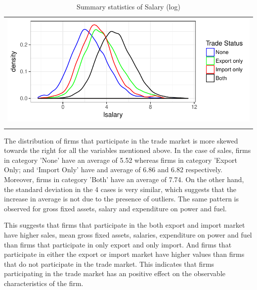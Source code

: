 \documentclass[12pt]{article}
\begin{document}
\begin{center}
\begin{table}[H]
\caption{Summary statistics of Salary (log)}
\label{tab:lsalary}
\begin{tabular}{c}
 \includegraphics{./PICS/denslsalary.pdf}   \\ 
   \\  
\end{tabular}
\end{table}
\end{center}

The distribution of firms that participate in the trade market is more skewed towards the right for all the
variables mentioned above. In the case of sales, firms in category
'None' have an average of 5.52 whereas firms in category 'Export Only;
and `Import Only' have and average  of 6.86 and
6.82 respectively. Moreover, firms in category 'Both' have an average
of  7.74.  On the other hand, the standard deviation in the 4 
cases is very similar, which suggests that the increase in average is
not due to the presence of outliers. The same pattern is observed for
gross fixed assets, salary and expenditure on power and fuel. 

This suggests that firms that participate in the both export and import market have
higher sales, mean gross fixed assets,
salaries, expenditure on power and fuel than firms that participate in
only export and only import.  And firms that participate in either the
export or import market have higher values  than firms that do not
participate in the trade market. This indicates that firms participating
in the trade market has an positive effect on the observable characteristics of the firm.
\end{document}
